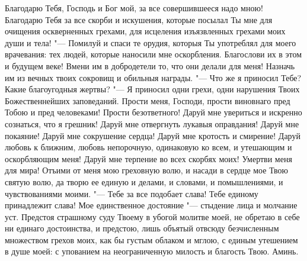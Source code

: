 Благодарю Тебя, Господь и Бог мой, за все совершившееся надо мною! Благодарю Тебя за все скорби и искушения, которые посылал Ты мне для очищения оскверненных грехами, для исцеления изъязвленных грехами моих души и тела! "--- Помилуй и спаси те орудия, которыя Ты употреблял для моего врачевания: тех людей, которые наносили мне оскорбления. Благослови их в этом и будущем веке! Вмени им в добродетели то, что они делали для меня! Назначь им из вечных твоих сокровищ и обильныя награды. "--- Что же я приносил Тебе? Какие благоугодныя жертвы? "--- Я приносил одни грехи, одни нарушения Твоих Божественнейших заповеданий. Прости меня, Господи, прости виновнаго пред Тобою и пред человеками! Прости безответного! Даруй мне увериться и искренно сознаться, что я грешник! Даруй мне отвергнуть лукавыя оправдания! Даруй мне покаяние! Даруй мне сокрушение сердца! Даруй мне кротость и смирение! Даруй любовь к ближним, любовь непорочную, одинаковую ко всем, и утешающим и оскорбляющим меня! Даруй мне терпение во всех скорбях моих! Умертви меня для мира! Отъими от меня мою греховную волю, и насади в сердце мое Твою святую волю, да творю ее единую и делами, и словами, и помышлениями, и чувствованиями моими. "--- Тебе за все подобает слава! Тебе единому принадлежит слава! Мое единственное достояние "--- стыдение лица и молчание уст. Предстоя страшному суду Твоему в убогой молитве моей, не обретаю в себе ни единаго достоинства, и предстою, лишь объятый отвсюду безчисленным множеством грехов моих, как бы густым облаком и мглою, с единым утешением в душе моей: с упованием на неограниченную милость и благость Твою. Аминь.
\mychapterending
